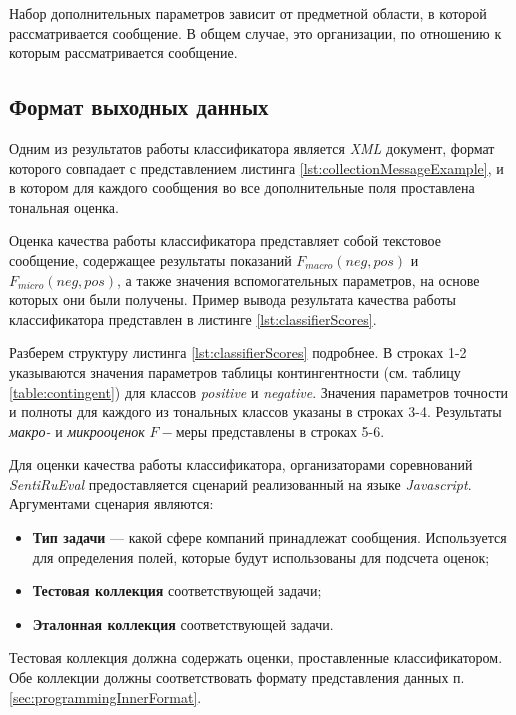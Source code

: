     Набор дополнительных параметров зависит от предметной области, в которой
    рассматривается сообщение. В общем случае, это организации, по отношению к
    которым рассматривается сообщение.

    \subsection{Формат выходных данных}
    Одним из результатов работы классификатора является {\it XML}
    документ, формат которого совпадает с представлением листинга \ref{lst:collectionMessageExample},
    и в котором для каждого сообщения во все дополнительные поля проставлена
    тональная оценка.

    Оценка качества работы классификатора представляет собой текстовое сообщение,
    содержащее результаты показаний  $F_{macro}(neg, pos)$ и $F_{micro}(neg, pos)$,
    а также значения вспомогательных параметров, на основе которых они были
    получены. Пример вывода результата качества работы классификатора представлен
    в листинге \ref{lst:classifierScores}.

    \lstset{style=bash, numbers=left}
    

    Разберем структуру листинга \ref{lst:classifierScores} подробнее. В строках 1-2
    указываются значения параметров таблицы контингентности (см. таблицу \ref{table:contingent})
    для классов {\it positive} и {\it negative}. Значения параметров точности и
    полноты для каждого из тональных классов указаны в строках 3-4. Результаты
    {\it макро-} и {\it микрооценок} $F-$меры представлены в строках 5-6.

    Для оценки качества работы классификатора, организаторами соревнований
    {\it SentiRuEval} предоставляется сценарий реализованный на языке {\it Javascript}.
    Аргументами сценария являются:
    \begin{itemize}
        \item {\bf Тип задачи} --- какой сфере компаний принадлежат сообщения. Используется
            для определения полей, которые будут использованы для подсчета оценок;
        \item {\bf Тестовая коллекция} соответствующей задачи;
        \item {\bf Эталонная коллекция} соответствующей задачи.
    \end{itemize}

    Тестовая коллекция должна содержать оценки, проставленные классификатором.
    Обе коллекции должны соответствовать формату представления данных п.
    \ref{sec:programmingInnerFormat}.
